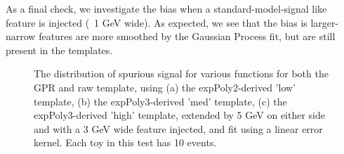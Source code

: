 As a final check, we investigate the bias when a standard-model-signal like feature is injected (~1 GeV wide). As expected, we see that the bias is larger- narrow features are more smoothed by the Gaussian Process fit, but are still present in the templates.

\begin{figure} 
\begin{center}

\caption{The distribution of spurious signal for various functions for both the GPR and raw template, using (a) the expPoly2-derived 'low' template, (b) the expPoly3-derived 'med' template, (c) the expPoly3-derived 'high' template, extended by 5 GeV on either side and with a 3 GeV wide feature injected, and fit using a linear error kernel. Each toy in this test has 10 events.}
\label{fig:linearkernel_lowpt_10_Sig_1s}
\end{center}
\end{figure}

